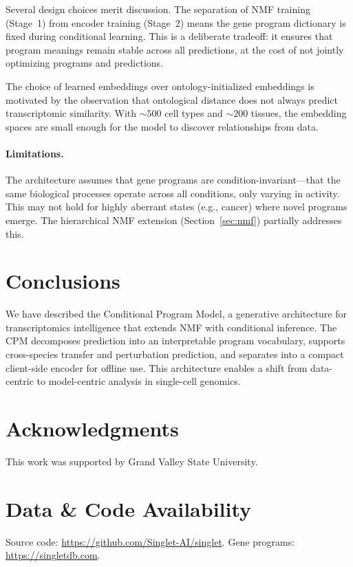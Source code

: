 \documentclass[10pt,twocolumn,letterpaper]{article}
\begin{document}
Several design choices merit discussion. The separation of NMF training (Stage~1)
from encoder training (Stage~2) means the gene program dictionary is fixed during
conditional learning. This is a deliberate tradeoff: it ensures that program
meanings remain stable across all predictions, at the cost of not jointly
optimizing programs and predictions.

The choice of learned embeddings over ontology-initialized embeddings is
motivated by the observation that ontological distance does not always predict
transcriptomic similarity. With ${\sim}500$ cell types and ${\sim}200$ tissues,
the embedding spaces are small enough for the model to discover relationships
from data.

\paragraph{Limitations.}
The architecture assumes that gene programs are condition-invariant---that the
same biological processes operate across all conditions, only varying in activity.
This may not hold for highly aberrant states (e.g., cancer) where novel programs
emerge. The hierarchical NMF extension (Section~\ref{sec:nmf}) partially
addresses this.

\section{Conclusions}
\label{sec:conclusions}

We have described the Conditional Program Model, a generative architecture for
transcriptomics intelligence that extends NMF with conditional inference. The
CPM decomposes prediction into an interpretable program vocabulary, supports
cross-species transfer and perturbation prediction, and separates into a compact
client-side encoder for offline use. This architecture enables a shift from
data-centric to model-centric analysis in single-cell genomics.

\section*{Acknowledgments}
This work was supported by Grand Valley State University.

\section*{Data \& Code Availability}
Source code: \url{https://github.com/Singlet-AI/singlet}.
Gene programs: \url{https://singletdb.com}.


\end{document}
